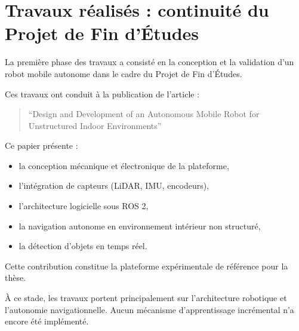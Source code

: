\section{Travaux réalisés : continuité du Projet de Fin d’Études}

La première phase des travaux a consisté en la conception et la validation d’un robot mobile autonome dans le cadre du Projet de Fin d’Études.

Ces travaux ont conduit à la publication de l’article :
\begin{quote}
“Design and Development of an Autonomous Mobile Robot for Unstructured Indoor Environments” \\
\cite{my_robot_paper}
\end{quote}

Ce papier présente :
\begin{itemize}
    \item la conception mécanique et électronique de la plateforme,
    \item l’intégration de capteurs (LiDAR, IMU, encodeurs),
    \item l’architecture logicielle sous ROS 2,
    \item la navigation autonome en environnement intérieur non structuré,
    \item la détection d’objets en temps réel.
\end{itemize}

Cette contribution constitue la plateforme expérimentale de référence pour la thèse.

À ce stade, les travaux portent principalement sur l’architecture robotique et l’autonomie navigationnelle. Aucun mécanisme d’apprentissage incrémental n’a encore été implémenté.
